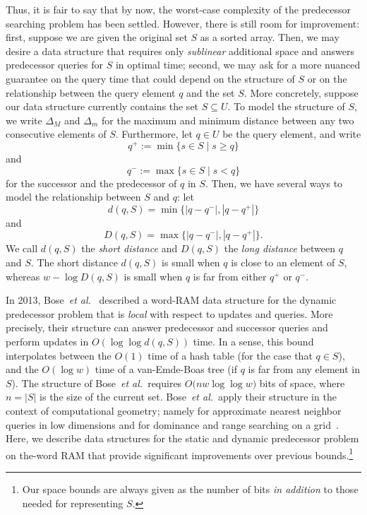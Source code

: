 \documentclass[a4paper,11pt]{article}
\newcommand{\etal}{\emph{et al.}\xspace}
\newcommand{\?}{\mskip1.5mu}
\begin{document}
Thus, it is fair to say that by now, 
the worst-case complexity of the predecessor 
searching problem has been settled. However, there is 
still room for improvement: first, suppose we are 
given the original set $S$ as a sorted array. Then,
we may desire a data structure that requires 
only \emph{sublinear} additional space and answers
predecessor queries for $S$ in optimal time; second, 
we may ask for a more nuanced guarantee on the query 
time that could depend on the structure of $S$ or on 
the relationship between the query element $q$ and 
the set $S$. More concretely, suppose our data 
structure currently contains the set $S \subseteq U$. 
To model the structure of $S$, we write $\Delta_M$ 
and $\Delta_m$ for the maximum and minimum distance 
between any two consecutive elements of $S$.
Furthermore, let $q \in U$ be the query element,  
and write
\[
  q^+ := \min\{s \in S \mid s \geq q \}
\]
and
\[
q^- := \max\{s \in S \mid s < q \}
\] 
for the 
successor and the predecessor of $q$ in $S$.
Then, we have several ways to model the
relationship between $S$ and $q$: 
let 
\[
d(q, S) = \min\big\{|q - q^-|, |q - q^+|\big\}
\]
and 
\[
D(q, S) = \max\big\{|q - q^-|, |q - q^+|\big\}.
\]
We call $d(q,S)$ the \emph{short distance} and 
$D(q, S)$ the \emph{long distance} between $q$ and 
$S$.
The short distance $d(q, S)$ is small when $q$ is 
close to an element of $S$, whereas $w - \log D(q, S)$
is small when $q$ is far from either $q^+$
or $q^-$. 

In 2013, Bose~\etal~\cite{BoseDoDuHoMo13} described
a word-RAM data structure for the dynamic predecessor
problem that is \emph{local} with respect to updates
and queries.
More precisely, their structure can answer predecessor 
and successor queries and perform updates 
in $O(\log\log d(q, S))$ time.
In a sense, this bound interpolates between
the $O(1)$ time of a hash table (for the
case that $q \in S$), and the $O(\log w)$ 
time of a van-Emde-Boas tree (if $q$ is far from
any element in $S$).
The structure of Bose~\etal~requires $O\big(n w \log\log w)$ bits 
of space, where $n = |S|$ is the size of the 
current set. Bose~\etal~apply their structure in 
the context of computational geometry; 
namely for approximate nearest 
neighbor queries in low dimensions and for 
dominance and range searching on a grid~\cite{BoseDoDuHoMo13}.
Here, we describe data structures for the
static and dynamic predecessor problem
on the-word RAM that provide significant 
improvements over previous bounds.\footnote{Our 
space bounds are always given as the
number of bits \emph{in addition} to those needed for 
representing $S$.} 
\end{document}
